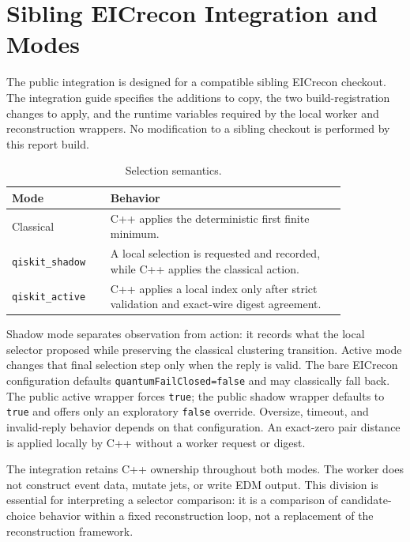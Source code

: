 \section{Sibling EICrecon Integration and Modes}
The public integration is designed for a compatible sibling EICrecon checkout. The integration guide specifies the additions to copy, the two build-registration changes to apply, and the runtime variables required by the local worker and reconstruction wrappers. No modification to a sibling checkout is performed by this report build.

\begin{table}[htbp]\centering\small
\caption{Selection semantics.}\begin{tabular}{L{0.24\linewidth}L{0.60\linewidth}}\toprule
Mode & Behavior\\\midrule
Classical & C++ applies the deterministic first finite minimum.\\
\texttt{qiskit\_shadow} & A local selection is requested and recorded, while C++ applies the classical action.\\
\texttt{qiskit\_active} & C++ applies a local index only after strict validation and exact-wire digest agreement.\\\bottomrule
\end{tabular}\end{table}

Shadow mode separates observation from action: it records what the local selector proposed while preserving the classical clustering transition. Active mode changes that final selection step only when the reply is valid. The bare EICrecon configuration defaults \texttt{quantumFailClosed=false} and may classically fall back. The public active wrapper forces \texttt{true}; the public shadow wrapper defaults to \texttt{true} and offers only an exploratory \texttt{false} override. Oversize, timeout, and invalid-reply behavior depends on that configuration. An exact-zero pair distance is applied locally by C++ without a worker request or digest.

\measured The integration retains C++ ownership throughout both modes. The worker does not construct event data, mutate jets, or write EDM output. This division is essential for interpreting a selector comparison: it is a comparison of candidate-choice behavior within a fixed reconstruction loop, not a replacement of the reconstruction framework.
\clearpage
